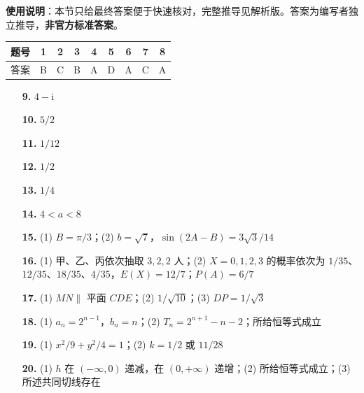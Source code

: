 
\begin{gknotice}
\textbf{使用说明}：本节只给最终答案便于快速核对，完整推导见解析版。答案为编写者独立推导，\textbf{非官方标准答案}。
\end{gknotice}

\begin{center}\begin{tabular}{ccccccccc}
\toprule
题号 & 1 & 2 & 3 & 4 & 5 & 6 & 7 & 8 \\
\midrule
答案 & B & C & B & A & D & A & C & A \\
\bottomrule
\end{tabular}\end{center}

\begin{itemize}[leftmargin=2.6em]
  \item[\textbf{9.}] $4-\mathrm i$
  \item[\textbf{10.}] $5/2$
  \item[\textbf{11.}] $1/12$
  \item[\textbf{12.}] $1/2$
  \item[\textbf{13.}] $1/4$
  \item[\textbf{14.}] $4<a<8$
\end{itemize}

\begin{itemize}[leftmargin=2.6em]
  \item[\textbf{15.}] (1) $B=\pi/3$；(2) $b=\sqrt7$，$\sin(2A-B)=3\sqrt3/14$
  \item[\textbf{16.}] (1) 甲、乙、丙依次抽取 $3,2,2$ 人；(2) $X=0,1,2,3$ 的概率依次为 $1/35$、$12/35$、$18/35$、$4/35$，$E(X)=12/7$；$P(A)=6/7$
  \item[\textbf{17.}] (1) $MN\parallel$ 平面 $CDE$；(2) $1/\sqrt{10}$；(3) $DP=1/\sqrt3$
  \item[\textbf{18.}] (1) $a_n=2^{n-1}$，$b_n=n$；(2) $T_n=2^{n+1}-n-2$；所给恒等式成立
  \item[\textbf{19.}] (1) $x^2/9+y^2/4=1$；(2) $k=1/2$ 或 $11/28$
  \item[\textbf{20.}] (1) $h$ 在 $(-\infty,0)$ 递减，在 $(0,+\infty)$ 递增；(2) 所给恒等式成立；(3) 所述共同切线存在
\end{itemize}
